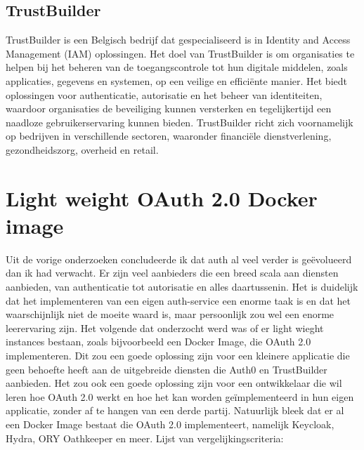 \subsection{TrustBuilder}%
\label{subsec:trustbuilder}
TrustBuilder is een Belgisch bedrijf dat gespecialiseerd is in Identity and Access Management (IAM) oplossingen. Het doel van TrustBuilder is om organisaties te helpen bij het beheren van de toegangscontrole tot hun digitale middelen, zoals applicaties, gegevens en systemen, op een veilige en efficiënte manier. Het biedt oplossingen voor authenticatie, autorisatie en het beheer van identiteiten, waardoor organisaties de beveiliging kunnen versterken en tegelijkertijd een naadloze gebruikerservaring kunnen bieden. TrustBuilder richt zich voornamelijk op bedrijven in verschillende sectoren, waaronder financiële dienstverlening, gezondheidszorg, overheid en retail.



\section{Light weight OAuth 2.0 Docker image}%
\label{sec:light-weight-oauth-2.0-docker-image}
Uit de vorige onderzoeken concludeerde ik dat auth al veel verder is geëvolueerd dan ik had verwacht. Er zijn veel aanbieders die een breed scala aan diensten aanbieden, van authenticatie tot autorisatie en alles daartussenin. Het is duidelijk dat het implementeren van een eigen auth-service een enorme taak is en dat het waarschijnlijk niet de moeite waard is, maar persoonlijk zou wel een enorme leerervaring zijn.
\newline
\newline
Het volgende dat onderzocht werd was of er light wieght instances bestaan, zoals bijvoorbeeld een Docker Image, die OAuth 2.0 implementeren. Dit zou een goede oplossing zijn voor een kleinere applicatie die geen behoefte heeft aan de uitgebreide diensten die Auth0 en TrustBuilder aanbieden. Het zou ook een goede oplossing zijn voor een ontwikkelaar die wil leren hoe OAuth 2.0 werkt en hoe het kan worden geïmplementeerd in hun eigen applicatie, zonder af te hangen van een derde partij.
\newline
\newline
Natuurlijk bleek dat er al een Docker Image bestaat die OAuth 2.0 implementeert, namelijk Keycloak, Hydra, ORY Oathkeeper en meer.
\newline
\newline
Lijst van vergelijkingscriteria:

